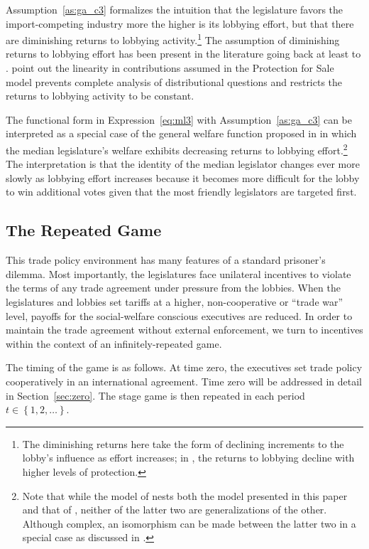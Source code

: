 \documentclass[authoryear, review]{elsarticle}
\begin{document}
Assumption~\ref{as:ga_c3} formalizes the intuition that the legislature favors the import-competing industry more the higher is its lobbying effort, but that there are diminishing returns to lobbying activity.\footnote{The diminishing returns here take the form of declining increments to the lobby's influence as effort increases; in \citet{ethier2012}, the returns to lobbying decline with higher levels of protection.} The assumption of diminishing returns to lobbying effort has been present in the literature going back at least to \citet{fw}. \citet{dgh97} point out the linearity in contributions assumed in the Protection for Sale model prevents complete analysis of distributional questions and restricts the returns to lobbying activity to be constant.

The functional form in Expression~\ref{eq:ml3} with Assumption~\ref{as:ga_c3} can be interpreted as a special case of the general welfare function proposed in \citet{dgh97} in which the median legislature's welfare exhibits decreasing returns to lobbying effort.\footnote{Note that while the model of \citet{dgh97} nests both the model presented in this paper and that of \citet{gh94}, neither of the latter two are generalizations of the other. Although complex, an isomorphism can be made between the latter two in a special case as discussed in \citet{buzard2013b}.\label{fn:dghpfs}} The interpretation is that the identity of the median legislator changes ever more slowly as lobbying effort increases because it becomes more difficult for the lobby to win additional votes given that the most friendly legislators are targeted first.

\subsection{The Repeated Game}
\label{sec:repeated}
This trade policy environment has many features of a standard prisoner's dilemma. Most importantly, the legislatures face unilateral incentives to violate the terms of any trade agreement under pressure from the lobbies. When the legislatures and lobbies set tariffs at a higher, non-cooperative or ``trade war'' level, payoffs for the social-welfare conscious executives are reduced. In order to maintain the trade agreement without external enforcement, we turn to incentives within the context of an infinitely-repeated game.

The timing of the game is as follows. At time zero, the executives set trade policy cooperatively in an international agreement. Time zero will be addressed in detail in Section~\ref{sec:zero}. The stage game is then repeated in each period $t\in\left\{1,2,\ldots \right\}$.
\end{document}
